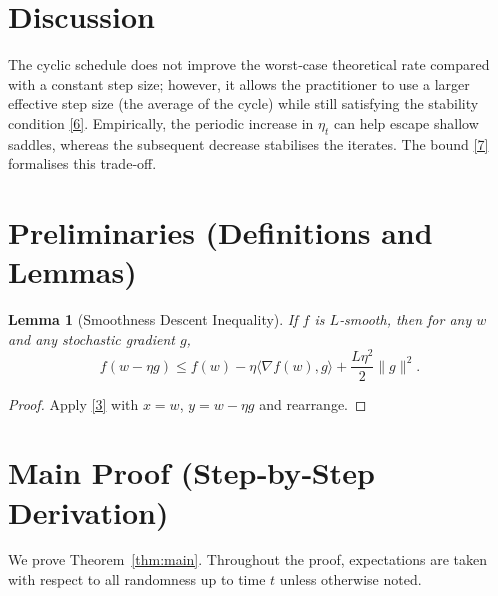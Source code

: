 \documentclass{article}
\newtheorem{lemma}{Lemma}
\begin{document}
\section*{Discussion}
The cyclic schedule does not improve the worst‑case theoretical rate compared with a constant step size; however, it allows the practitioner to use a larger effective step size (the average of the cycle) while still satisfying the stability condition \eqref{6}. Empirically, the periodic increase in $\eta_t$ can help escape shallow saddles, whereas the subsequent decrease stabilises the iterates. The bound \eqref{7} formalises this trade‑off.

\newpage

\section*{Preliminaries (Definitions and Lemmas)}
\begin{lemma}[Smoothness Descent Inequality]\label{lem:smooth}
If $f$ is $L$‑smooth, then for any $w$ and any stochastic gradient $g$,
\[
f(w-\eta g)\le f(w)-\eta\langle\nabla f(w),g\rangle+\frac{L\eta^{2}}{2}\|g\|^{2}.
\tag{8}
\]
\end{lemma}
\begin{proof}
Apply \eqref{3} with $x=w$, $y=w-\eta g$ and rearrange.
\end{proof}

\section*{Main Proof (Step‑by‑Step Derivation)}
We prove Theorem~\ref{thm:main}. Throughout the proof, expectations are taken with respect to all randomness up to time $t$ unless otherwise noted.
\end{document}
